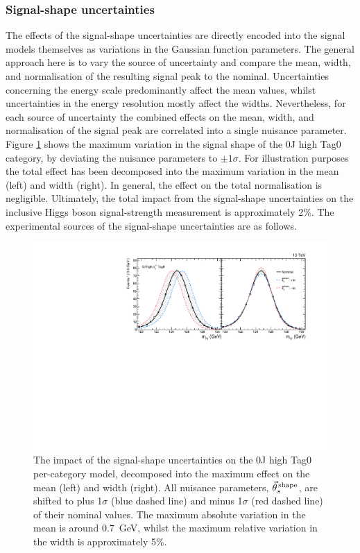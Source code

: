\subsubsection{Signal-shape uncertainties}
The effects of the signal-shape uncertainties are directly encoded into the signal models themselves as variations in the Gaussian function parameters. The general approach here is to vary the source of uncertainty and compare the mean, width, and normalisation of the resulting signal \mgg peak to the nominal. Uncertainties concerning the energy scale predominantly affect the mean values, whilst uncertainties in the energy resolution mostly affect the widths. Nevertheless, for each source of uncertainty the combined effects on the mean, width, and normalisation of the signal peak are correlated into a single nuisance parameter. Figure \ref{fig:systematics_sigshape} shows the maximum variation in the signal shape of the 0J high \ptgg Tag0 category, by deviating the nuisance parameters to $\pm 1\sigma$. For illustration purposes the total effect has been decomposed into the maximum variation in the mean (left) and width (right). In general, the effect on the total normalisation is negligible. Ultimately, the total impact from the signal-shape uncertainties on the inclusive Higgs boson signal-strength measurement is approximately 2\%. The experimental sources of the signal-shape uncertainties are as follows.

\begin{figure}
  \centering
  \includegraphics[width=1\textwidth]{Figures/hgg_stats/shapeSyst_withVertex_dropHighR9.pdf}
  \caption[Signal shape systematic uncertainties]
  {
    The impact of the signal-shape uncertainties on the 0J high \ptgg Tag0 per-category model, decomposed into the maximum effect on the mean (left) and width (right). All nuisance parameters, $\vec{\theta}^{\,\rm{shape}}_{s}$, are shifted to plus 1$\sigma$ (blue dashed line) and minus 1$\sigma$ (red dashed line) of their nominal values. The maximum absolute variation in the mean is around 0.7~GeV, whilst the maximum relative variation in the width is approximately 5\%.
  }
  \label{fig:systematics_sigshape}
\end{figure}


